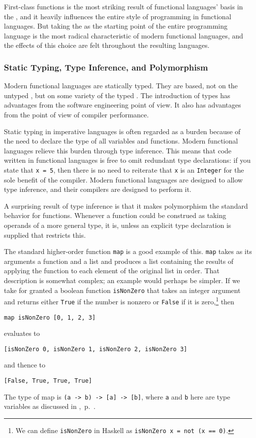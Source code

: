First-class functions is the most striking result of functional languages' basis in the \lambdacalc{}, and it heavily influences the entire style of programming in functional languages. But taking the \lambdacalc as the starting point of the entire programming language is the most radical characteristic of modern functional languages, and the effects of this choice are felt throughout the resulting languages.

\subsubsection{Static Typing, Type Inference, and Polymorphism}
Modern functional languages are statically typed. They are based, not on the untyped \lambdacalc{}, but on some variety of the typed \lambdacalc{}. The introduction of types has advantages from the software engineering point of view. It also has advantages from the point of view of compiler performance.

Static typing in imperative languages is often regarded as a burden because of the need to declare the type of all variables and functions. Modern functional languages relieve this burden through type inference. This means that code written in functional languages is free to omit redundant type declarations: if you state that \lstinline{x = 5}, then there is no need to reiterate that \lstinline{x} is an \lstinline{Integer} for the sole benefit of the compiler. Modern functional languages are designed to allow type inference, and their compilers are designed to perform it.

A surprising result of type inference is that it makes polymorphism the standard behavior for functions. Whenever a function could be construed as taking operands of a more general type, it is, unless an explicit type declaration is supplied that restricts this.

The standard higher-order function \lstinline{map} is a good example of this. \lstinline{map} takes as its arguments a function and a list and produces a list containing the results of applying the function to each element of the original list in order. That description is somewhat complex; an example would perhaps be simpler. If we take for granted a boolean function \lstinline{isNonZero} that takes an integer argument and returns either \lstinline{True} if the number is nonzero or \lstinline{False} if it is zero,\footnote{We can define \lstinline{isNonZero} in Haskell as \lstinline{isNonZero x = not (x == 0)}.} then 
\begin{lstlisting}
map isNonZero [0, 1, 2, 3]
\end{lstlisting}
evaluates to 
\begin{lstlisting}
[isNonZero 0, isNonZero 1, isNonZero 2, isNonZero 3]
\end{lstlisting}
and thence to 
\begin{lstlisting}
[False, True, True, True]
\end{lstlisting}
The type of map is \lstinline{(a -> b) -> [a] -> [b]}, where \lstinline{a} and \lstinline{b} here are type variables as discussed in ,~p.~\pageref{types:polymorphism}.

